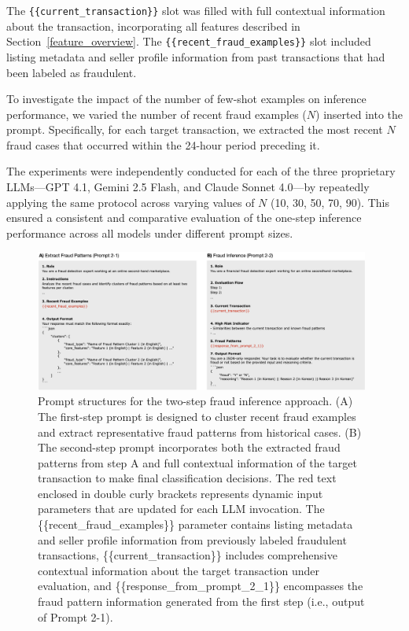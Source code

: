 \documentclass[sigconf]{acmart}
\begin{document}
The \texttt{\{\{current\_transaction\}\}} slot was filled with full contextual information about the transaction, incorporating all features described in Section~\ref{feature_overview}. The \texttt{\{\{recent\_fraud\_examples\}\}} slot included listing metadata and seller profile information from past transactions that had been labeled as fraudulent.

To investigate the impact of the number of few-shot examples on inference performance, we varied the number of recent fraud examples ($N$) inserted into the prompt. Specifically, for each target transaction, we extracted the most recent $N$ fraud cases that occurred within the 24-hour period preceding it. 

The experiments were independently conducted for each of the three proprietary LLMs—GPT 4.1, Gemini 2.5 Flash, and Claude Sonnet 4.0—by repeatedly applying the same protocol across varying values of $N$ (10, 30, 50, 70, 90). This ensured a consistent and comparative evaluation of the one-step inference performance across all models under different prompt sizes.


\begin{figure}[t!]
  \centering
  \includegraphics[width=0.98\textwidth]{./figures/fig_prompt_2step.png}
  \caption{Prompt structures for the two-step fraud inference approach. (A) The first-step prompt is designed to cluster recent fraud examples and extract representative fraud patterns from historical cases. (B) The second-step prompt incorporates both the extracted fraud patterns from step A and full contextual information of the target transaction to make final classification decisions. The red text enclosed in double curly brackets represents dynamic input parameters that are updated for each LLM invocation. The \{\{recent\_fraud\_examples\}\} parameter contains listing metadata and seller profile information from previously labeled fraudulent transactions, \{\{current\_transaction\}\} includes comprehensive contextual information about the target transaction under evaluation, and \{\{response\_from\_prompt\_2\_1\}\} encompasses the fraud pattern information generated from the first step (i.e., output of Prompt 2-1).}
  \label{fig_prompt_2step}
\end{figure}
\end{document}
